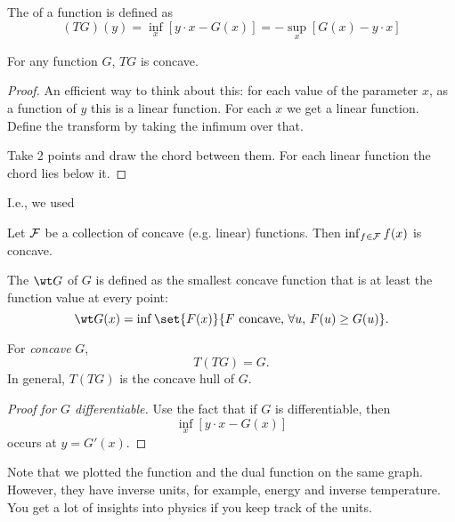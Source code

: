 \begin{df}
The  of a function is defined as
\[
(TG)(y) = \inf_x [y\cdot x - G(x)] = - \sup_x [G(x) - y\cdot x]
\]
\end{df}
\begin{thm}
For any function $G$, $TG$ is concave.
\end{thm}
\begin{proof}
An efficient way to think about this: for each value of the parameter $x$, as a function of $y$ this is a linear function. For each $x$ we get a linear function. Define the transform by taking the infimum over that. 

Take 2 points and draw the chord between them. For each linear function the chord lies below it. 

\end{proof}
I.e., we used
\begin{pr}
Let $\cal F$ be a collection of concave (e.g. linear) functions. Then $\inf_{f\in \cal F}f(x)$ is concave.
\end{pr}
\begin{df}
The  $\wt G$ of $G$ is defined as the smallest concave function that is at least the function value at every point:
\[
\wt G(x)=\inf \set{F(x)}{F\text{ concave, }\forall u, \,F(u)\ge G(u)}.
\]
\end{df}


\begin{thm}
For \emph{concave} $G$,
\[
T(TG)=G.
\]
In general, $T(TG)$ is the concave hull of $G$. 
\end{thm}
\begin{proof}[Proof for $G$ differentiable]
Use the fact that if $G$ is differentiable, then
\[
\inf_x [y\cdot x - G(x)]
\]
occurs at $y=G'(x)$. %
\end{proof}

Note that we plotted the function and the dual function on the same graph. However, they have inverse units, for example, energy and inverse temperature. You get a lot of insights into physics if you keep track of the units.


